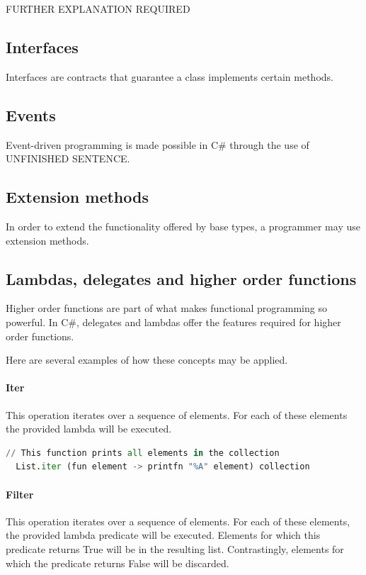 \documentclass{article}
\begin{document}
{\huge FURTHER EXPLANATION REQUIRED}

\subsection{Interfaces}
Interfaces are contracts that guarantee a class implements certain methods.

\subsection{Events}
Event-driven programming is made possible in C\# through the use of {\huge UNFINISHED SENTENCE}.

\subsection{Extension methods}
In order to extend the functionality offered by base types, a programmer may use extension methods.

\subsection{Lambdas, delegates and higher order functions}
Higher order functions are part of what makes functional programming so powerful.
In C\#, delegates and lambdas offer the features required for higher order functions.

Here are several examples of how these concepts may be applied.

\paragraph{Iter}
This operation iterates over a sequence of elements. For each of these elements the provided lambda will be executed.

\begin{lstlisting}[language=Python]
  // This function prints all elements in the collection
  List.iter (fun element -> printfn "%A" element) collection
\end{lstlisting}

\paragraph{Filter}
This operation iterates over a sequence of elements. For each of these elements, the provided lambda predicate will be executed.
Elements for which this predicate returns True will be in the resulting list. Contrastingly, elements for which the predicate returns False will be discarded.
\end{document}
